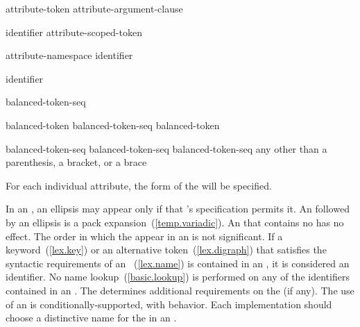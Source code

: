 \begin{bnf}
\br
    attribute-token attribute-argument-clause\opt
\end{bnf}

\begin{bnf}
\br
    identifier\br
    attribute-scoped-token
\end{bnf}

\begin{bnf}
\br
    attribute-namespace \terminal{::} identifier
\end{bnf}

\begin{bnf}
\br
    identifier
\end{bnf}

\begin{bnf}
\br
    \terminal{(} balanced-token-seq \terminal{)}
\end{bnf}

\begin{bnf}
\br
    balanced-token\opt\br
    balanced-token-seq balanced-token
\end{bnf}

\begin{bnf}
\br
    \terminal{(} balanced-token-seq \terminal{)}\br
    \terminal{[} balanced-token-seq \terminal{]}\br
    \terminal{\{} balanced-token-seq \terminal{\}}\br
    \textnormal{any  other than a parenthesis, a bracket, or a brace}
\end{bnf}

\pnum
\enternote For each individual attribute, the form of the
 will be specified. \exitnote

\pnum
In an , an ellipsis may appear only if that
's specification permits it. An  followed
by an ellipsis is a pack expansion~(\ref{temp.variadic}).
An  that contains no  has no
effect. The order in which the  appear in an
 is not significant. If a
keyword~(\ref{lex.key})
or an alternative token~(\ref{lex.digraph}) that satisfies the syntactic requirements
of an ~(\ref{lex.name}) is
contained in
an , it is considered an identifier. No name
lookup~(\ref{basic.lookup}) is performed on any of the identifiers contained in an
. The  determines additional
requirements on the  (if any). The use of an
 is conditionally-supported, with
 behavior. \enternote Each implementation
should choose a distinctive name for the  in an
. \exitnote

